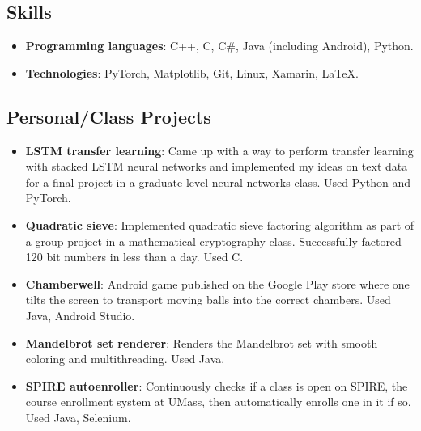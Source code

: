 \documentclass{article}
\begin{document}
	\subsection*{Skills}
		\begin{itemize}[noitemsep,leftmargin=40pt]
			\item \textbf{Programming languages}: C++, C, C\#, Java (including Android), Python.
			\item \textbf{Technologies}: PyTorch, Matplotlib, Git, Linux, Xamarin, \LaTeX.
		\end{itemize}
	\subsection*{Personal/Class Projects}
    	\begin{itemize}[noitemsep,leftmargin=40pt]
    		\item \textbf{LSTM transfer learning}: Came up with a way to perform transfer learning with stacked LSTM neural networks and implemented my ideas on text data for a final project in a graduate-level neural networks class. Used Python and PyTorch.
        	\item \textbf{Quadratic sieve}: Implemented quadratic sieve factoring algorithm as part of a group project in a mathematical cryptography class. Successfully factored 120 bit numbers in less than a day. Used C.
            \item \textbf{Chamberwell}: Android game published on the Google Play store where one tilts the screen to transport moving balls into the correct chambers. Used Java, Android Studio.
			\item \textbf{Mandelbrot set renderer}: Renders the Mandelbrot set with smooth coloring and multithreading. Used Java.
            \item \textbf{SPIRE autoenroller}: Continuously checks if a class is open on SPIRE, the course enrollment system at UMass, then automatically enrolls one in it if so. Used Java, Selenium.
        \end{itemize}
\end{document}
